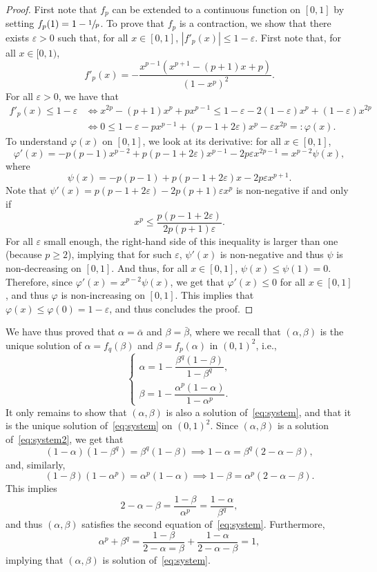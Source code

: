 \documentclass[11pt]{article}
\newcommand{\ie}{i.e.,\xspace}
\let \nicefrac\sfrac
\numberwithin{equation}{section}
\theoremstyle{definition}
\begin{document}
\begin{proof}
First note that $f_p$ can be extended to a continuous function on $[0,1]$ by setting $f_p(1) = 1-\nicefrac1p$. To prove that $f_p$ is a contraction, we show that there exists $\varepsilon>0$ such that, for all $x\in[0,1]$, $|f'_p(x)|\leq 1-\varepsilon$.
First note that, for all $x\in [0,1)$,
\[
f'_p(x) = -\frac{x^{p-1}(x^{p+1}-(p+1)x+{p})}{(1-x^p)^2}.
\]
For all $\varepsilon>0$, we have that
\begin{align*}
f'_p(x)\leq 1-\varepsilon
&\iff x^{2p}-(p+1)x^p +px^{p-1}
\leq 1-\varepsilon -2(1-\varepsilon)x^p+(1-\varepsilon) x^{2p}\\
&\iff 0\leq 1-\varepsilon - px^{p-1} + (p-1+2\varepsilon)x^p-\varepsilon x^{2p}
=:\varphi(x).
\end{align*}
To understand $\varphi(x)$ on $[0,1]$, we look at its derivative: for all $x\in [0,1]$,
\[
\varphi'(x)
= -p(p-1)x^{p-2}+p(p-1+2\varepsilon)x^{p-1}-2p\varepsilon x^{2p-1} = x^{p-2}\psi(x),
\]
where
\[
\psi(x) = -p(p-1)+p(p-1+2\varepsilon)x-2p\varepsilon x^{p+1}.
\]
Note that $\psi'(x) = p(p-1+2\varepsilon)-2p(p+1)\varepsilon x^p$ is non-negative if and only if
\[
x^p\leq \frac{p(p-1+2\varepsilon)}{2p(p+1)\varepsilon}.
\]
For all $\varepsilon$ small enough, the right-hand side of this inequality is larger than one (because $p\geq 2$), implying that for such $\varepsilon$, $\psi'(x)$ is non-negative and thus $\psi$ is non-decreasing on $[0,1]$.
And thus, for all $x\in [0,1]$, $\psi(x)\leq \psi(1) = 0$.
Therefore, since $\varphi'(x) = x^{p-2}\psi(x)$, we get that $\varphi'(x)\leq 0$ for all $x\in [0,1]$,
and thus $\varphi$ is non-increasing on $[0,1]$. This implies that
$\varphi(x)\leq \varphi(0) = 1-\varepsilon$, and thus concludes the proof.
\end{proof}

We have thus proved that $\alpha = \bar\alpha$ and $\beta = \bar\beta$,
where we recall that $(\alpha, \beta)$ is the unique solution of $\alpha = f_q(\beta)$ and $\beta = f_p(\alpha)$ in $(0,1)^2$, \ie
\begin{equation}\label{eq:system2}
\begin{cases}
\alpha = 1-\dfrac{\beta^q(1-\beta)}{1-\beta^q},\\[5pt]
\beta = 1-\dfrac{\alpha^p(1-\alpha)}{1-\alpha^p}.
\end{cases}
\end{equation}
It only remains to show that $(\alpha,\beta)$ is also {a} solution of~\eqref{eq:system},
and that it is the unique solution of~\eqref{eq:system} on $(0,1)^2$.
Since $(\alpha,\beta)$ is {a} solution of~\eqref{eq:system2}, we get that
\[
(1-\alpha)(1-\beta^q) =\beta^q(1-\beta)
\implies 1-\alpha=\beta^q(2-\alpha-\beta),
\]
and, similarly,
\[
(1-\beta)(1-\alpha^p) =\alpha^p(1-\alpha)
\implies 1-\beta=\alpha^p(2-\alpha-\beta).
\]
This implies
\[
2-\alpha-\beta = \frac{1-\beta}{\alpha^p} = \frac{1-\alpha}{\beta^q},
\]
and thus $(\alpha,\beta)$ satisfies the second equation of~\eqref{eq:system}.
Furthermore,
\[
\alpha^p+\beta^q = \frac{1-\beta}{2-\alpha=\beta} + \frac{1-\alpha}{2-\alpha-\beta} = 1,
\]
implying that $(\alpha,\beta)$ is solution of~\eqref{eq:system}.
\end{document}
